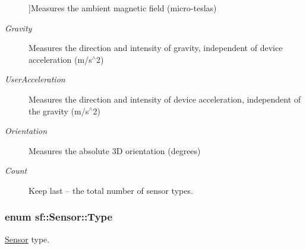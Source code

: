 \begin{Desc}
\begin{description}
{}]Measures the ambient magnetic field (micro-\/teslas) \item[{\em 
\hypertarget{classsf_1_1_sensor_a687375af3ab77b818fca73735bcaea84a88fc8025c897135e18ea02cfe26c7361}{Gravity}\label{classsf_1_1_sensor_a687375af3ab77b818fca73735bcaea84a88fc8025c897135e18ea02cfe26c7361}
}]Measures the direction and intensity of gravity, independent of device acceleration (m/s$^\wedge$2) \item[{\em 
\hypertarget{classsf_1_1_sensor_a687375af3ab77b818fca73735bcaea84a34768d68b445e72ff6a43fde92a7b921}{User\-Acceleration}\label{classsf_1_1_sensor_a687375af3ab77b818fca73735bcaea84a34768d68b445e72ff6a43fde92a7b921}
}]Measures the direction and intensity of device acceleration, independent of the gravity (m/s$^\wedge$2) \item[{\em 
\hypertarget{classsf_1_1_sensor_a687375af3ab77b818fca73735bcaea84a9fca0168d56fad3e328d59d09f3d4fb3}{Orientation}\label{classsf_1_1_sensor_a687375af3ab77b818fca73735bcaea84a9fca0168d56fad3e328d59d09f3d4fb3}
}]Measures the absolute 3\-D orientation (degrees) \item[{\em 
\hypertarget{classsf_1_1_sensor_a687375af3ab77b818fca73735bcaea84ade647efb34c9d194e432fa0397d3f656}{Count}\label{classsf_1_1_sensor_a687375af3ab77b818fca73735bcaea84ade647efb34c9d194e432fa0397d3f656}
}]Keep last -- the total number of sensor types. \end{description}
\end{Desc}
\hypertarget{classsf_1_1_sensor_a687375af3ab77b818fca73735bcaea84}{
\subsubsection[{Type}]{\setlength{\rightskip}{0pt plus 5cm}enum {\bf sf\-::\-Sensor\-::\-Type}}}\label{classsf_1_1_sensor_a687375af3ab77b818fca73735bcaea84}


\hyperlink{classsf_1_1_sensor}{Sensor} type. 

